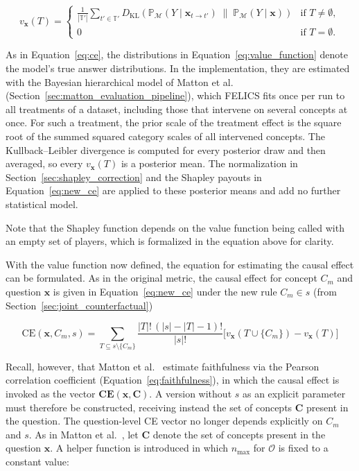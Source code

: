 \begin{equation}
	\label{eq:value_function}
	v_{\mathbf{x}}(T) =
	\begin{cases}
		\frac{1}{|\mathbb{T}'|}
		\sum_{t' \in \mathbb{T}'}
		D_{\mathrm{KL}}
		\left(
		\mathbb{P}_{\mathcal{M}}(Y \mid \mathbf{x}_{t \rightarrow t'})
		\;\middle\|\;
		\mathbb{P}_{\mathcal{M}}(Y \mid \mathbf{x})
		\right) & \text{if } T \neq \emptyset, \\
		0       & \text{if } T = \emptyset.
	\end{cases}
\end{equation}

As in Equation~\ref{eq:ce}, the distributions in Equation~\ref{eq:value_function} denote the model's true answer distributions. In the implementation, they are estimated with the Bayesian hierarchical model of Matton et al.~\cite{mattonWalkTalkMeasuring2024} (Section~\ref{sec:matton_evaluation_pipeline}), which FELICS fits once per run to all treatments of a dataset, including those that intervene on several concepts at once. For such a treatment, the prior scale of the treatment effect is the square root of the summed squared category scales of all intervened concepts. The Kullback--Leibler divergence is computed for every posterior draw and then averaged, so every $v_{\mathbf{x}}(T)$ is a posterior mean. The normalization in Section~\ref{sec:shapley_correction} and the Shapley payouts in Equation~\ref{eq:new_ce} are applied to these posterior means and add no further statistical model.

Note that the Shapley function depends on the value function being called with an empty set of players, which is formalized in the equation above for clarity.

With the value function now defined, the equation for estimating the causal effect can be formulated. As in the original metric, the causal effect for concept $C_m$ and question $\mathbf{x}$ is given in Equation~\ref{eq:new_ce} under the new rule $C_m \in s$ (from Section~\ref{sec:joint_counterfactual})

\begin{equation}
	\label{eq:new_ce}
	\mathrm{CE}(\mathbf{x},C_m, s)=
	\sum_{T \subseteq s \setminus \{C_m\}} \frac{|T|!\, (|s|-|T|-1)!}{|s|!} \big[ v_{\mathbf{x}}(T \cup \{C_m\}) - v_{\mathbf{x}}(T) \big]
\end{equation}

Recall, however, that Matton et al.~\cite{mattonWalkTalkMeasuring2024} estimate faithfulness via the Pearson correlation coefficient (Equation~\ref{eq:faithfulness}), in which the causal effect is invoked as the vector $\mathbf{CE}(\mathbf{x},\mathbf{C})$. A version without $s$ as an explicit parameter must therefore be constructed, receiving instead the set of concepts $\mathbf{C}$ present in the question. The question-level CE vector no longer depends explicitly on $C_m$ and $s$. As in Matton et al.~\cite{mattonWalkTalkMeasuring2024}, let $\mathbf{C}$ denote the set of concepts present in the question $\mathbf{x}$. A helper function is introduced in which $n_{\max}$ for $\mathcal{O}$ is fixed to a constant value:

